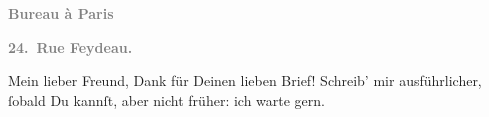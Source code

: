 \pstart
           \begin{otherlanguage}{french}\textcolor{gray}{\textbf{\textbf{Bureau à Paris}}}\end{otherlanguage}\pend
           
\pstart
           \begin{otherlanguage}{french}\textcolor{gray}{\textbf{\textbf{24. Rue Feydeau.}}}\end{otherlanguage}\pend
           
\pstart\center{}Mein lieber Freund,\pend\vspace{0.5em}
\pstart
           Dank für Deinen lieben Brief! Schreib’ mir ausführlicher, ſobald Du kannſt, aber
               nicht früher: ich warte gern.\pend
           
